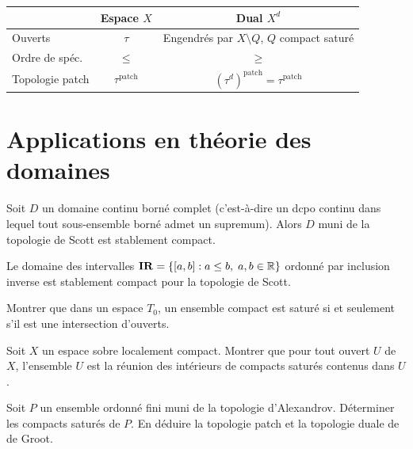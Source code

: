 \begin{formules}[title=\textbf{R\'esum\'e~: dualit\'e de de Groot}]
\begin{center}
\renewcommand{\arraystretch}{1.3}
\begin{tabular}{|l|c|c|}
\hline
& \textbf{Espace} $X$ & \textbf{Dual} $X^d$ \\
\hline
Ouverts & $\tau$ & Engendr\'es par $X \setminus Q$, $Q$ compact satur\'e \\
Ordre de sp\'ec. & $\leq$ & $\geq$ \\
Topologie patch & $\tau^{\mathrm{patch}}$ & $(\tau^d)^{\mathrm{patch}} = \tau^{\mathrm{patch}}$ \\
\hline
\end{tabular}
\end{center}
\end{formules}

\section{Applications en th\'eorie des domaines}

\begin{theoreme}
Soit $D$ un domaine continu born\'e complet (c'est-\`a-dire un dcpo continu dans lequel
tout sous-ensemble born\'e admet un supremum). Alors $D$ muni de la topologie de Scott
est stablement compact.
\end{theoreme}

\begin{corollaire}
Le domaine des intervalles $\mathbf{IR} = \{[a,b] : a \leq b, \; a,b \in \mathbb{R}\}$ ordonn\'e
par inclusion inverse est stablement compact pour la topologie de Scott.
\end{corollaire}

\begin{exercice}
Montrer que dans un espace $T_0$, un ensemble compact est satur\'e si et seulement s'il
est une intersection d'ouverts.
\end{exercice}

\begin{exercice}
Soit $X$ un espace sobre localement compact. Montrer que pour tout ouvert $U$ de $X$,
l'ensemble $U$ est la r\'eunion des int\'erieurs de compacts satur\'es contenus dans $U$.
\end{exercice}

\begin{exercice}
Soit $P$ un ensemble ordonn\'e fini muni de la topologie d'Alexandrov. D\'eterminer les
compacts satur\'es de $P$. En d\'eduire la topologie patch et la topologie duale de de Groot.
\end{exercice}

